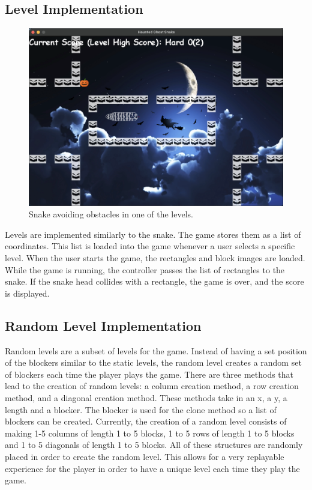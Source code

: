 \documentclass[sigplan,screen]{acmart}
\begin{document}
\subsection{Level Implementation}

\begin{figure}[h]
  \centering
  \includegraphics[width=\linewidth]{gameplay_static_level}
  \caption{Snake avoiding obstacles in one of the levels.}
\end{figure}

Levels are implemented similarly to the snake. The game stores them as a list of coordinates. This list is loaded into the game whenever a user selects a specific level. When the user starts the game, the rectangles and block images are loaded. While the game is running, the controller passes the list of rectangles to the snake. If the snake head collides with a rectangle, the game is over, and the score is displayed. 

\subsection{Random Level Implementation} 

Random levels are a subset of levels for the game. Instead of having a set position of the blockers similar to the static levels, the random level creates a random set of blockers each time the player plays the game. There are three methods that lead to the creation of random levels: a column creation method, a row creation method, and a diagonal creation method. These methods take in an x, a y, a length and a blocker. The blocker is used for the clone method so a list of blockers can be created. Currently, the creation of a random level consists of making 1-5 columns of length 1 to 5 blocks, 1 to 5 rows of length 1 to 5 blocks and 1 to 5 diagonals of length 1 to 5 blocks. All of these structures are randomly placed in order to create the random level. This allows for a very replayable experience for the player in order to have a unique level each time they play the game.
\end{document}
